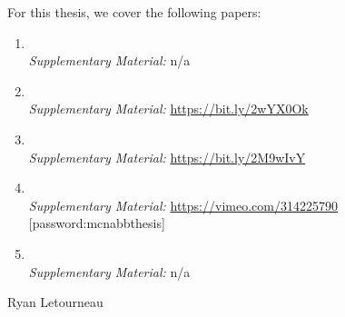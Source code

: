 \begin{preface}
  For this thesis, we cover the following papers:
  
  \begin{enumerate}
  \footnotesize
  \item {} \cite{mcnabb2017sos}\\ \emph{Supplementary Material: }n/a
  \item {} \cite{mcnabb2018dynamic}\\ \emph{Supplementary Material: } \url{https://bit.ly/2wYX0Ok}
  \item {} \cite{mcnabb2018when}\\ \emph{Supplementary Material: } \url{https://bit.ly/2M9wIvY}
  \item {} \cite{mcnabb2019multivariate}\\ \emph{Supplementary Material: }\url{https://vimeo.com/314225790} [password:mcnabbthesis]
  \item {} \cite{mcnabb2019how}\\ \emph{Supplementary Material:} n/a
  \end{enumerate}

  
\end{preface}

{\hypersetup{linkcolor=black}
\tableofcontents
}

%
  {Ryan Letourneau}
\thispagestyle{empty}
